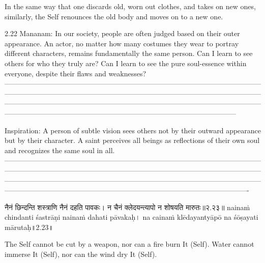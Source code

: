 In the same way that one discards old, worn out clothes, and takes on new ones, similarly, the Self renounces the old body and moves on to a new one.

2.22 Mananam:
In our society, people are often judged based on their outer appearance. An actor, no matter how many costumes they wear to portray different characters, remains fundamentally the same person. Can I learn to see others for who they truly are? Can I learn to see the pure soul-essence within everyone, despite their flaws and weaknesses?
—-----------------------------------------------------------------------------------------------------------------------------------------------------------------------------------------------------------------------------------------------------------------------------------------------------------------------------------------------------------------------------------------------------------------------------------

Inspiration:
A person of subtle vision sees others not by their outward appearance but by their character. A saint perceives all beings as reflections of their own soul and recognizes the same soul in all.
—----------------------------------------------------------------------------------------------------------------------------------------------------------------------------------------------------------------------------------------------------------------------------------------------------------------------------------------------------------------------------------------------------------------------------------------


नैनं छिन्दन्ति शस्त्राणि नैनं दहति पावकः। 
न चैनं क्लेदयन्त्यापो न शोषयति मारुतः॥२.२३॥
nainaṁ chindanti śastrāṇi nainaṁ dahati pāvakaḥ। 
na cainaṁ klēdayantyāpō na śōṣayati mārutaḥ॥2.23॥

The Self cannot be cut by a weapon, nor can a fire burn It (Self). Water cannot immerse It (Self), nor can the wind dry It (Self).

